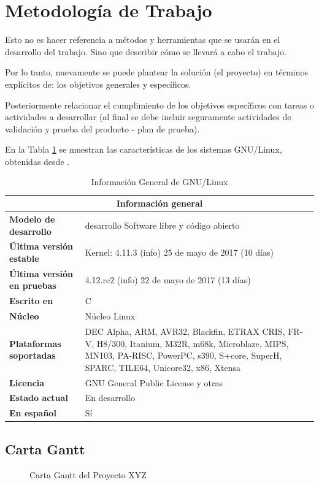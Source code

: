 \documentclass[letter,12pt]{report}
\begin{document}
\section{Metodología de Trabajo}
Esto no es hacer referencia a métodos y herramientas que se usarán en el desarrollo del trabajo. Sino que describir cómo se llevará a cabo el trabajo.

Por lo tanto, nuevamente se puede plantear la solución (el proyecto) en términos explícitos de: los objetivos generales y específicos.

Posteriormente relacionar el cumplimiento de los objetivos específicos con tareas o actividades a desarrollar (al final se debe incluir seguramente actividades de validación y prueba del producto - plan de prueba).



En la Tabla \ref{t:info} se muestran las características de los sistemas GNU/Linux,
obtenidas desde \cite{c02}.


\begin{table}[hbt]
\begin{center}
\begin{tabular}{|l|p{10cm}|}\hline
\multicolumn{2}{|c|}{\textbf{Información general}}\\
\hline
\textbf{Modelo de desarrollo}&desarrollo	Software libre y código abierto\\
\textbf{Última versión estable}&Kernel: 4.11.3 (info) 25 de mayo de 2017 (10 días)\\
\textbf{Última versión en pruebas}&	4.12.rc2 (info) 22 de mayo de 2017 (13 días)\\
\textbf{Escrito en}&	C\\
\textbf{Núcleo}&	Núcleo Linux\\
\textbf{Plataformas soportadas}	& DEC Alpha, ARM, AVR32, Blackfin, ETRAX CRIS, FR-V, H8/300, Itanium, M32R, m68k, Microblaze, MIPS, MN103, PA-RISC, PowerPC, s390, S+core, SuperH, SPARC, TILE64, Unicore32, x86, Xtensa\\
\textbf{Licencia}	&GNU General Public License y otras\\
\textbf{Estado actual}	&En desarrollo\\
\textbf{En español}	&Sí\\
\hline
\end{tabular}
\end{center}
\caption{Información General de GNU/Linux}
\label{t:info}
\end{table}

\begin{landscape}
\subsection{Carta Gantt}\label{gantt}
\begin{figure}[hbt]
  \centering
  \caption{Carta Gantt del Proyecto XYZ}
  \label{gantt}
\end{figure}
\end{landscape}
\end{document}

